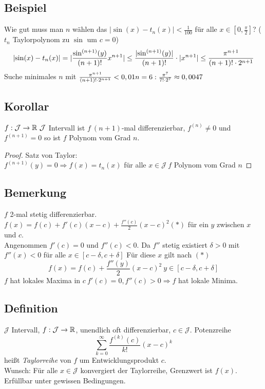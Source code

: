 \subsection{Beispiel}
Wie gut muss man $n$ wählen das $|\sin(x) - t_n(x)| < \frac 1{100}$ für alle $x \in [0,\frac \pi 2]$? ($t_n$ Taylorpolynom zu $\sin$ um $c = 0$)
\[\lvert \sin(x) - t_n(x) \rvert = \lvert \frac{\sin^{(n+1)}(y)}{(n+1)!} x^{n+1} \rvert \leq \frac{\lvert \sin^{(n+1)}(y) \rvert }{(n+1)!} \cdot \lvert x^{n+1} \rvert \leq \frac{\pi^{n+1}}{(n+1)! \cdot 2^{n+1}} \]
Suche minimales $n$ mit $\frac{\pi^{n+1}}{(n+1)! \cdot 2^{n+1}} < 0,01\\
n = 6: \frac{\pi^7}{7! \cdot 2^7} \approx 0,0047$\\
\subsection{Korollar}
$f : \mathcal{J} \to \R\ \mathcal{J}$ Intervall ist $f\ (n+1)$-mal differenzierbar, $f^{(n)} \ne 0$ und $f^{(n+1)} = 0$ so ist $f$ Polynom vom Grad $n$.
\begin{proof}
Satz von Taylor:\\
$f^{(n+1)}(y) = 0 \Rightarrow f(x) = t_n(x)$ für alle $x \in \mathcal{J}\ f$ Polynom vom Grad $n$
\end{proof}
\subsection{Bemerkung}
$f$ 2-mal stetig  differenzierbar.\\
$f(x) = f(c) + f'(c)(x-c)  + \frac{f''(c)}{2}(x-c)^2 (\ast)$ für ein $y$ zwischen $x$ und $c$.\\
Angenommen $f'(c) = 0$ und $f''(c) < 0$. Da $f''$ stetig existiert $\delta > 0$ mit $f''(x) < 0$ für alle $x \in [c-\delta, c + \delta]$ Für diese $x$ gilt nach $(\ast)$\\
\[f(x) = f(c) + \frac{f''(y)}{2}(x-c)^2\ y \in [c-\delta,c+\delta] \]
$f$ hat lokales Maxima in $c\ f'(c) = 0, f''(c) > 0 \Rightarrow f$ hat lokale Minima.
\subsection{Definition}
$\mathcal{J}$ Intervall, $f: \mathcal{J} \to \mathbb{R}$, unendlich oft differenzierbar, $c \in \mathcal{J}$. Potenzreihe
\[ \sum\limits_{k=0}^{\infty} \frac{f^{(k)}(c)}{k!}(x-c)^k \]
hei\ss t \emph{Taylorreihe} von $f$ um Entwicklungsprodukt $c$.\\
Wunsch: Für alle $x \in \mathcal{J}$ konvergiert der Taylorreihe, Grenzwert ist $f(x)$.\\
Erfüllbar unter gewissen Bedingungen.
